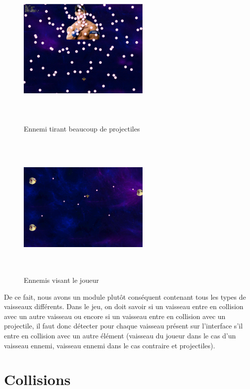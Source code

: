 \documentclass[a4paper, 12pt]{report}
\begin{document}
\begin{figure}[!ht]
	\centering
	\begin{minipage}[t]{.49\linewidth}
		\centering
		\includegraphics[height=200pt, width=180pt]{images/johncena.png}
		\caption{Ennemi tirant beaucoup de projectiles}
	\end{minipage}
	\begin{minipage}[t]{.49\linewidth}
		\centering
		\includegraphics[height=200pt, width=180pt]{images/poissons.png}
		\caption{Ennemis visant le joueur}
	\end{minipage}
\end{figure}

\noindent De ce fait, nous avons un module plutôt conséquent contenant tous les
types de vaisseaux différents. Dans le jeu, on doit savoir si un vaisseau entre
en collision avec un autre vaisseau ou encore si un vaisseau entre en collision
avec un projectile, il faut donc détecter pour chaque vaisseau présent sur
l'interface s'il entre en collision avec un autre élément (vaisseau du joueur
dans le cas d'un vaisseau ennemi, vaisseau ennemi dans le cas contraire et
projectiles).

\section{Collisions}
\end{document}

